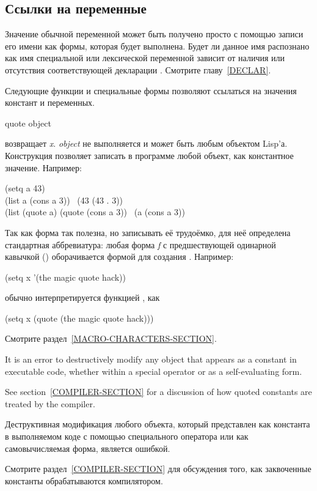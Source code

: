 \subsection{Ссылки на переменные}

Значение обычной переменной может быть получено просто с помощью записи его
имени как формы, которая будет выполнена. Будет ли данное имя распознано как имя
специальной или лексической переменной зависит от наличия или отсутствия
соответствующей декларации . Смотрите главу~\ref{DECLAR}.

Следующие функции и специальные формы позволяют ссылаться на значения констант и
переменных.

\begin{defspec}
quote object

 возвращает \emph{x}.
\emph{object} не выполняется и может быть любым объектом Lisp'а.
Конструкция позволяет записать в программе любой объект, как константное
значение.
Например:
\begin{lisp}
(setq a 43) \\
(list a (cons a 3)) \EV\ (43 (43 . 3)) \\
(list (quote a) (quote (cons a 3)) \EV\ (a (cons a 3))
\end{lisp}
Так как  форма так полезна, но записывать её трудоёмко, для неё
определена стандартная аббревиатура:
любая форма \emph{f} с предшествующей одинарной кавычкой ()
оборачивается формой  для создания .
Например:
\begin{lisp}
(setq x '(the magic quote hack))
\end{lisp}
обычно интерпретируется функцией , как
\begin{lisp}
(setq x (quote (the magic quote hack)))
\end{lisp}
Смотрите раздел~\ref{MACRO-CHARACTERS-SECTION}.


It is an error to destructively modify any object that appears as a constant
in executable code, whether within a  special operator or as
a self-evaluating form.

See section~\ref{COMPILER-SECTION} for a discussion of how quoted constants
are treated by the compiler.

Деструктивная модификация любого объекта, который представлен как константа в
выполняемом коде с помощью специального оператора  или как
самовычисляемая форма, является ошибкой.

Смотрите раздел~\ref{COMPILER-SECTION} для обсуждения того, как заквоченные
константы обрабатываются компилятором.


\end{defspec}
